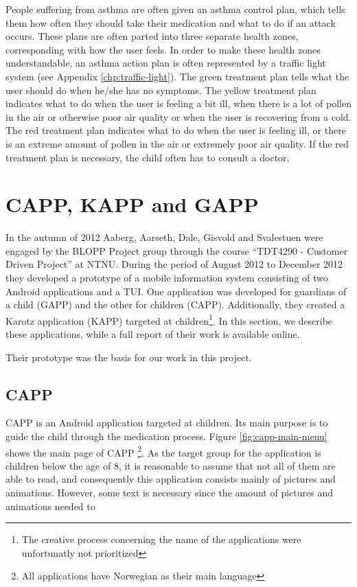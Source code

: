 People suffering from asthma are often given an asthma control plan, which tells them how often they should take their medication and what to do if an attack occurs. These plans are often parted into three separate health zones, corresponding with how the user feels. In order to make these health zones understandable, an asthma action plan is often represented by a traffic light system (see Appendix \ref{chp:traffic-light}). The green treatment plan tells what the user should do when he/she has no symptoms. The yellow treatment plan indicates what to do when the user is feeling a bit ill, when there is a lot of pollen in the air or otherwise poor air quality or when the user is recovering from a cold. The red treatment plan indicates what to do when the user is feeling ill, or there is an extreme amount of pollen in the air or extremely poor air quality. If the red treatment plan is necessary, the child often has to consult a doctor. 


\section{CAPP, KAPP and GAPP}
\label{sec:cappgappkapp}
In the autumn of 2012 Aaberg, Aarseth, Dale, Gisvold and Svalestuen were engaged by the BLOPP Project group through the course ``TDT4290 - Customer Driven Project'' at NTNU. During the period of August 2012 to December 2012 they developed a prototype of a mobile information system consisting of two Android applications and a TUI. One application was developed for guardians of a child (GAPP) and the other for children (CAPP). Additionally, they created a Karotz application (KAPP) targeted at children\footnote{The creative process concerning the name of the applications were unfortunatly not prioritized}. In this section, we describe these applications, while a full report of their work is available online\cite{CustomerDriven}. 

Their prototype was the basis for our work in this project. 


\subsection{CAPP}
\label{sec:description-capp}
CAPP is an Android application targeted at children. Its main purpose is to guide the child through the medication process. Figure \ref{fig:capp-main-menu} shows the main page of CAPP \footnote{All applications have Norwegian as their main language}.  
As the target group for the application is children below the age of 8, it is reasonable to assume that not all of them are able to read, and consequently this application consists mainly of pictures and animations. However, some text is necessary since the amount of pictures and animations needed to 


